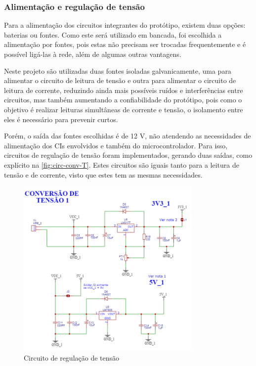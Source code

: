 \subsubsection{Alimentação e regulação de tensão}

Para a alimentação dos circuitos integrantes do protótipo, existem duas opções: baterias ou fontes. Como este será utilizado em bancada, foi escolhida a alimentação por fontes, pois estas não precisam ser trocadas frequentemente e é possível ligá-las à rede, além de algumas outras vantagens.

Neste projeto são utilizadas duas fontes isoladas galvanicamente, uma para alimentar o circuito de leitura de tensão e outra para alimentar o circuito de leitura de corrente, reduzindo ainda mais possíveis ruídos e interferências entre circuitos, mas também aumentando a confiabilidade do protótipo, pois como o objetivo é realizar leituras simultâneas de corrente e tensão, o isolamento entre eles é necessário para prevenir curtos.

Porém, o saída das fontes escolhidas é de 12 V, não atendendo as necessidades de alimentação dos \gls{CI}s envolvidos e também do microcontrolador. Para isso, circuitos de regulação de tensão foram implementados, gerando duas saídas, como explícito na \autoref{fig:circ-conv-T}. Estes circuitos são iguais tanto para a leitura de tensão e de corrente, visto que estes tem as mesmas necessidades.

\begin{figure}[htb!]
    \caption{Circuito de regulação de tensão}
    \label{fig:circ-conv-T}
    \includegraphics[width=0.8\textwidth]{figuras/circ-conv-T.png}
    \fonte{}
\end{figure}

